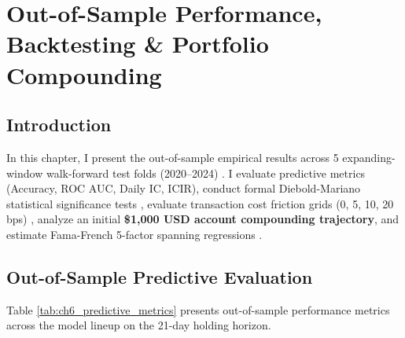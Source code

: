 \chapter{Out-of-Sample Performance, Backtesting \& Portfolio Compounding}
\label{ch:ml_and_backtesting}

\section{Introduction}
In this chapter, I present the out-of-sample empirical results across 5 expanding-window walk-forward test folds (2020--2024) \citep{lopez2018advances}. I evaluate predictive metrics (Accuracy, ROC AUC, Daily IC, ICIR), conduct formal Diebold-Mariano statistical significance tests \citep{diebold1995comparing, harvey1997testing}, evaluate transaction cost friction grids (0, 5, 10, 20 bps) \citep{novy2016taxonomy, avramov2023machine}, analyze an initial \textbf{\$1,000 USD account compounding trajectory}, and estimate Fama-French 5-factor spanning regressions \citep{fama2015five, carhart1997on, hou2015digesting}.

\section{Out-of-Sample Predictive Evaluation}
Table \ref{tab:ch6_predictive_metrics} presents out-of-sample performance metrics across the model lineup on the 21-day holding horizon.

\begin{table}[H]
\centering
\caption{Out-of-Sample Predictive Performance Metrics (2020--2024 Test Folds)}
\label{tab:ch6_predictive_metrics}
\end{table}

